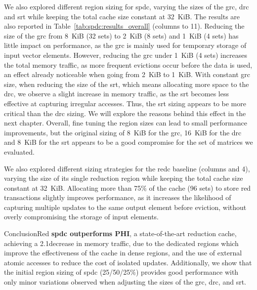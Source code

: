 We also explored different region sizing for \acrlong{spdc}, varying the sizes of the \acrshort{grc}, \acrshort{drc} and \acrshort{srt} while keeping the total cache size constant at 32~KiB.
The results are also reported in Table~\ref{tab:spdc:results_overall} (columns  to 11).
Reducing the size of the \acrshort{grc} from 8~KiB (32 \glspl{set}) to 2~KiB (8 \glspl{set}) and 1~KiB (4 \glspl{set}) has little impact on performance, as the \acrshort{grc} is mainly used for temporary storage of input vector elements.
However, reducing the \acrshort{grc} under 1~KiB (4 \glspl{set}) increases the total memory traffic, as more frequent \glspl{eviction} occur before the data is used, an effect already noticeable when going from 2~KiB to 1~KiB.
With constant \acrshort{grc} size, when reducing the size of the \acrshort{srt}, which means allocating more space to the \acrshort{drc}, we observe a slight increase in memory traffic, as the \acrshort{srt} becomes less effective at capturing irregular accesses.
Thus, the \acrshort{srt} sizing appears to be more critical than the \acrshort{drc} sizing.
We will explore the reasons behind this effect in the next chapter.
Overall, fine tuning the region sizes can lead to small performance improvements, but the original sizing of 8~KiB for the \acrshort{grc}, 16~KiB for the \acrshort{drc} and 8~KiB for the \acrshort{srt} appears to be a good compromise for the set of matrices we evaluated.

We also explored different sizing strategies for the \acrshort{redc} baseline (columns  and 4), varying the size of its single \gls{reduction} region while keeping the total cache size constant at 32~KiB.
Allocating more than 75\% of the cache (96 \glspl{set}) to store \acrshort{red} transactions slightly improves performance, as it increases the likelihood of capturing multiple updates to the same output element before \gls{eviction}, without overly compromising the storage of input elements.

\begin{highlight}{Conclusion}{Red}
    \textbf{\acrlong{spdc} outperforms PHI}, a state-of-the-art \gls{reduction} cache, achieving a 2.1\tms decrease in memory traffic, due to the dedicated regions which improve the effectiveness of the cache in dense regions, and the use of external atomic accesses to reduce the cost of isolated updates.
    Additionally, we show that the initial region sizing of \acrlong{spdc} (25/50/25\%) provides good performance with only minor variations observed when adjusting the sizes of the \acrshort{grc}, \acrshort{drc}, and \acrshort{srt}.
\end{highlight}